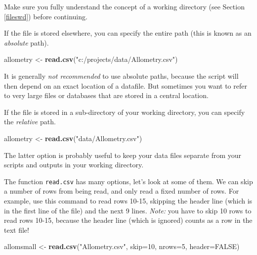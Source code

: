 \documentclass[]{book}
\newenvironment{Shaded}{\begin{snugshade}}{\end{snugshade}}
\newcommand{\DataTypeTok}[1]{\textcolor[rgb]{0.13,0.29,0.53}{#1}}
\newcommand{\DecValTok}[1]{\textcolor[rgb]{0.00,0.00,0.81}{#1}}
\newcommand{\KeywordTok}[1]{\textcolor[rgb]{0.13,0.29,0.53}{\textbf{#1}}}
\newcommand{\NormalTok}[1]{#1}
\newcommand{\OtherTok}[1]{\textcolor[rgb]{0.56,0.35,0.01}{#1}}
\newcommand{\StringTok}[1]{\textcolor[rgb]{0.31,0.60,0.02}{#1}}
\begin{document}
Make sure you fully understand the concept of a working directory (see Section \ref{fileswd}) before continuing.

If the file is stored elsewhere, you can specify the entire path (this is known as an \emph{absolute} path).

\begin{Shaded}
\begin{Highlighting}[]
\NormalTok{allometry <-}\StringTok{ }\KeywordTok{read.csv}\NormalTok{(}\StringTok{"c:/projects/data/Allometry.csv"}\NormalTok{)}
\end{Highlighting}
\end{Shaded}

It is generally \emph{not recommended} to use absolute paths, because the script will then depend on an exact location of a datafile. But sometimes you want to refer to very large files or databases that are stored in a central location.

If the file is stored in a sub-directory of your working directory, you can specify the \emph{relative} path.

\begin{Shaded}
\begin{Highlighting}[]
\NormalTok{allometry <-}\StringTok{ }\KeywordTok{read.csv}\NormalTok{(}\StringTok{"data/Allometry.csv"}\NormalTok{)}
\end{Highlighting}
\end{Shaded}

The latter option is probably useful to keep your data files separate from your scripts and outputs in your working directory.

The function \texttt{read.csv} has many options, let's look at some of them. We can skip a number of rows from being read, and only read a fixed number of rows. For example, use this command to read rows 10-15, skipping the header line (which is in the first line of the file) and the next 9 lines. \emph{Note:} you have to skip 10 rows to read rows 10-15, because the header line (which is ignored) counts as a row in the text file!

\begin{Shaded}
\begin{Highlighting}[]
\NormalTok{allomsmall <-}\StringTok{ }\KeywordTok{read.csv}\NormalTok{(}\StringTok{"Allometry.csv"}\NormalTok{, }\DataTypeTok{skip=}\DecValTok{10}\NormalTok{, }\DataTypeTok{nrows=}\DecValTok{5}\NormalTok{, }\DataTypeTok{header=}\OtherTok{FALSE}\NormalTok{)}
\end{Highlighting}
\end{Shaded}
\end{document}
